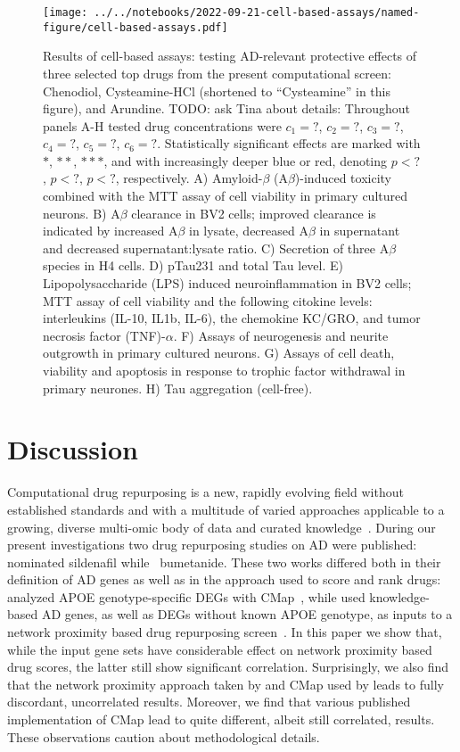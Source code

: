 \documentclass[letterpaper]{article}
\begin{document}
\begin{figure}
\texttt{[image: ../../notebooks/2022-09-21-cell-based-assays/named-figure/cell-based-assays.pdf]}
\caption{Results of cell-based assays: testing AD-relevant protective effects of three
  selected top drugs from the present computational screen: Chenodiol,
  Cysteamine-HCl (shortened to ``Cysteamine'' in this figure), and Arundine.
  TODO: ask Tina about details: Throughout panels A-H tested drug
  concentrations were $c_1 = ?$, $c_2 = ?$, $c_3 = ?$, $c_4 = ?$, $c_5 = ?$,
  $c_6 = ?$.  Statistically significant effects are marked with $\ast$,
  $\ast\ast$, $\ast\ast\ast$, and with increasingly deeper blue or red,
  denoting $p < ?$, $p < ?$,  $p < ?$, respectively.
  A) Amyloid-$\beta$ (A$\beta$)-induced toxicity combined with the MTT assay
  of cell viability in primary cultured neurons.
  B) A$\beta$ clearance in BV2 cells; improved clearance is indicated by
  increased A$\beta$ in lysate, decreased A$\beta$ in supernatant and
  decreased supernatant:lysate ratio.
  C) Secretion of three A$\beta$ species in H4 cells.
  D) pTau231 and total Tau level.
  E) Lipopolysaccharide (LPS) induced neuroinflammation in BV2 cells; MTT
  assay of cell viability and the following citokine levels: interleukins
  (IL-10, IL1b, IL-6), the chemokine KC/GRO, and tumor necrosis factor
  (TNF)-$\alpha$.
  F) Assays of neurogenesis and neurite outgrowth in primary cultured neurons.
  G) Assays of cell death, viability and apoptosis in response to trophic
  factor withdrawal in primary neurones.
  H) Tau aggregation (cell-free).
}
\label{fig:cell-based-assays}
\end{figure}


\section{Discussion}

Computational drug repurposing is a new, rapidly evolving field without
established standards and with a multitude of varied approaches applicable to
a growing, diverse multi-omic body of data and curated
knowledge~\citep{Pushpakom2019}.  During our present investigations two drug
repurposing studies on AD were published: \cite{Fang2021} nominated sildenafil
while~\cite{Taubes2021} bumetanide.  These two works differed both in their
definition of AD genes as well as in the approach used to score and rank
drugs: \cite{Taubes2021} analyzed APOE genotype-specific DEGs with
CMap~\citep{Lamb2006}, while \cite{Fang2021} used knowledge-based AD genes, as
well as DEGs without known APOE genotype, as inputs to a network proximity
based drug repurposing screen~\citep{Cheng2018}.  In this paper we show that,
while the input gene sets have considerable effect on network proximity based
drug scores, the latter still show significant correlation.  Surprisingly, we
also find that the network proximity approach taken by \cite{Fang2021} and
CMap used by \cite{Taubes2021} leads to fully discordant, uncorrelated
results.  Moreover, we find that various published implementation of CMap lead
to quite different, albeit still correlated, results.  These observations
caution about methodological details.
\end{document}
